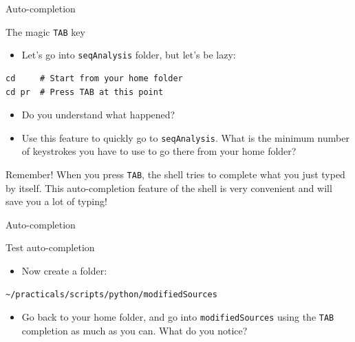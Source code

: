 \documentclass[big]{beamer}
\begin{document}
\begin{frame}[fragile,label=sec-2-20]{Auto-completion}
 \begin{block}{The magic \texttt{TAB} key}
\begin{itemize}
\item Let's go into \texttt{seqAnalysis} folder, but let's be lazy:
\end{itemize}
\begin{verbatim}
cd     # Start from your home folder
cd pr  # Press TAB at this point
\end{verbatim}
\begin{itemize}
\item Do you understand what happened?
\item Use this feature to quickly go to \texttt{seqAnalysis}. What is the minimum number
of keystrokes you have to use to go there from your home folder?
\end{itemize}
\end{block}
\begin{block}{Remember!}
When you press \alert{\texttt{TAB}}, the shell tries to complete what you just typed by
itself. This \alert{auto-completion feature} of the shell is very convenient and will
save you a lot of typing!
\end{block}
\end{frame}
\begin{frame}[fragile,label=sec-2-21]{Auto-completion}
 \begin{block}{Test auto-completion}
\begin{itemize}
\item Now create a folder:
\end{itemize}
\begin{verbatim}
~/practicals/scripts/python/modifiedSources
\end{verbatim}
\begin{itemize}
\item Go back to your home folder, and go into \texttt{modifiedSources} using the \texttt{TAB}
completion as much as you can. What do you notice?
\end{itemize}
\end{block}
\end{frame}
\end{document}
